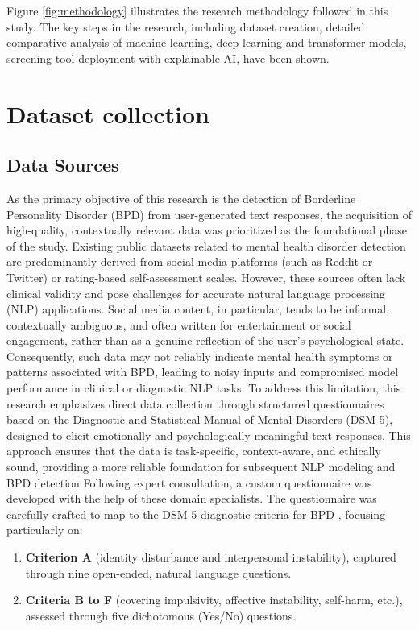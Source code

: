 Figure \ref{fig:methodology} illustrates the research methodology followed in this study. The key steps in the research, including dataset creation, detailed comparative analysis of machine learning, deep learning and transformer models, screening tool deployment with explainable AI, have been shown. 


\section{Dataset collection}
\subsection{Data Sources}
As the primary objective of this research is the detection of Borderline Personality Disorder (BPD) from user-generated text responses, the acquisition of high-quality, contextually relevant data was prioritized as the foundational phase of the study. Existing public datasets related to mental health disorder detection are predominantly derived from social media platforms (such as Reddit or Twitter) or rating-based self-assessment scales. However, these sources often lack clinical validity and pose challenges for accurate natural language processing (NLP) applications.
Social media content, in particular, tends to be informal, contextually ambiguous, and often written for entertainment or social engagement, rather than as a genuine reflection of the user's psychological state. Consequently, such data may not reliably indicate mental health symptoms or patterns associated with BPD, leading to noisy inputs and compromised model performance in clinical or diagnostic NLP tasks.
To address this limitation, this research emphasizes direct data collection through structured questionnaires based on the Diagnostic and Statistical Manual of Mental Disorders (DSM-5), designed to elicit emotionally and psychologically meaningful text responses. This approach ensures that the data is task-specific, context-aware, and ethically sound, providing a more reliable foundation for subsequent NLP modeling and BPD detection
Following expert consultation, a custom questionnaire was developed with the help of these domain specialists. The questionnaire was carefully crafted to map to the DSM-5 diagnostic criteria for BPD \cite{APA2013}, focusing particularly on:
\begin{enumerate}
    \item \textbf{Criterion A} (identity disturbance and interpersonal instability), captured through nine open-ended, natural language questions.
     \item \textbf{Criteria B to F} (covering impulsivity, affective instability, self-harm, etc.), assessed through five dichotomous (Yes/No) questions. 
\end{enumerate}

